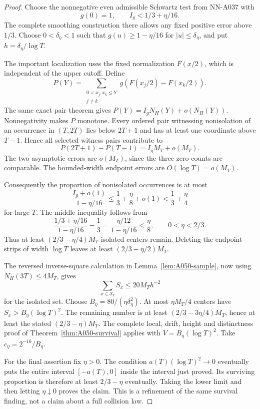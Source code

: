\begin{proof}
Choose the nonnegative even admissible Schwartz test from
NN-A037 with
\[
             g(0)=1,\qquad I_g<1/3+\eta/16.
\]
The complete smoothing construction there allows any fixed
positive error above \(1/3\). Choose \(0<\delta_\eta<1\)
such that \(g(u)\ge1-\eta/16\) for
\(|u|\le\delta_\eta\), and put
\(h=\delta_\eta/\log T\).

The important localization uses the fixed normalization
\(F(x/2)\), which is independent of the upper cutoff.
Define
\[
 P(Y)=\sum_{\substack{0<x_j,x_k\le Y\\j\ne k}}
       g\left(F(x_j/2)-F(x_k/2)\right).
\]
The same exact pair theorem gives
\(P(Y)=I_gN_H(Y)+o(N_H(Y))\). Nonnegativity makes \(P\)
monotone. Every ordered pair witnessing nonisolation
of an occurrence in \((T,2T)\) lies below \(2T+1\)
and has at least one coordinate above \(T-1\). Hence
all selected witness pairs contribute to
\[
 P(2T+1)-P(T-1)=I_g M_T+o(M_T).
\]
The two asymptotic errors are \(o(M_T)\), since the
three zero counts are comparable. The bounded-width
endpoint errors are \(O(\log T)=o(M_T)\).

Consequently the proportion of nonisolated occurrences is
at most
\[
 \frac{I_g+o(1)}{1-\eta/16}
 \le\frac13+\frac{\eta}{8}+o(1)
                      <\frac13+\frac{\eta}{4}
\]
for large \(T\). The middle inequality follows from
\[
 \frac{1/3+\eta/16}{1-\eta/16}-\frac13
       =\frac{\eta/12}{1-\eta/16}<\frac{\eta}{8},
               \qquad 0<\eta<2/3.
\]
Thus at least \((2/3-\eta/4)M_T\) isolated centers remain.
Deleting the endpoint strips of width \(\log T\)
leaves at least \((2/3-\eta/2)M_T\).

The reversed inverse-square calculation in
Lemma~\ref{lem:A050-sample}, now using
\(N_H(3T)\le4M_T\), gives
\[
            \sum_{x\in\mathcal S_T}S_x
                       \le20M_T h^{-2}
\]
for the isolated set. Choose
\(B_\eta=80/(\eta\delta_\eta^2)\).
At most \(\eta M_T/4\) centers have
\(S_x>B_\eta(\log T)^2\). The remaining number is at
least \((2/3-3\eta/4)M_T\), hence at least the stated
\((2/3-\eta)M_T\).
The complete local, drift, height and distinctness proof
of Theorem~\ref{thm:A050-survival} applies with
\(V=B_\eta(\log T)^2\). Take
\(c_\eta=2^{-16}/B_\eta\).

For the final assertion fix \(\eta>0\). The condition
\(a(T)(\log T)^2\to0\) eventually puts the entire interval
\([-a(T),0]\) inside the interval just proved. Its surviving
proportion is therefore at least \(2/3-\eta\) eventually.
Taking the lower limit and then letting \(\eta\downarrow0\)
proves the claim. This is a refinement of the same survival
finding, not a claim about a full collision law.
\end{proof}



